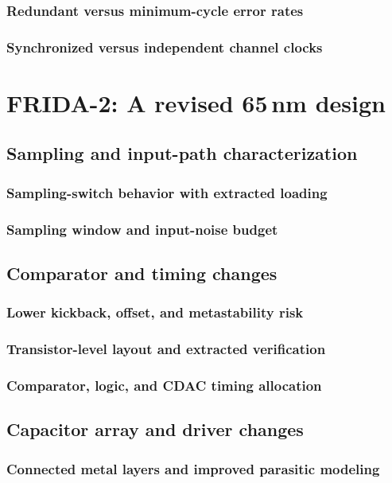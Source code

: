 \documentclass[PhD, UKenglish]{scrbook}
\begin{document}
\subsection{Redundant versus minimum-cycle error rates}
\subsection{Synchronized versus independent channel clocks}

\chapter[FRIDA-2: A revised 65 nm design]{FRIDA-2: A revised 65\,nm design}
\section{Sampling and input-path characterization}
\subsection{Sampling-switch behavior with extracted loading}
\subsection{Sampling window and input-noise budget}

\section{Comparator and timing changes}
\subsection{Lower kickback, offset, and metastability risk}
\subsection{Transistor-level layout and extracted verification}
\subsection{Comparator, logic, and CDAC timing allocation}

\section{Capacitor array and driver changes}
\subsection{Connected metal layers and improved parasitic modeling}
\end{document}
